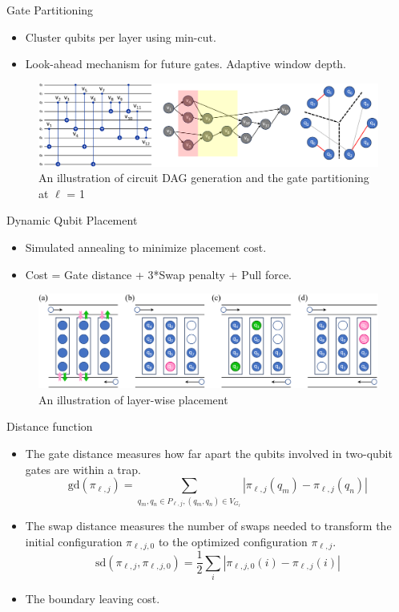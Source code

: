 \documentclass{beamer}
\begin{document}
	\begin{frame}{Gate Partitioning}
		\begin{itemize}
			\item Cluster qubits per layer using min-cut.
			\item Look-ahead mechanism for future gates. Adaptive window depth.
		\end{itemize}
		\begin{figure}
			\includegraphics[width=\textwidth]{figure/cut.png}
			\caption[]{An illustration of circuit DAG generation and the gate partitioning at $\ell$ = 1}
		\end{figure}
	\end{frame}
	
	\begin{frame}{Dynamic Qubit Placement}
		\begin{itemize}
			\item Simulated annealing to minimize placement cost.
			\item Cost = Gate distance + 3*Swap penalty + Pull force.
		\end{itemize}
		\begin{figure}
			\includegraphics[width=.8\textwidth]{figure/qubit.png}
			\caption[]{An illustration of layer-wise placement}
		\end{figure}
	\end{frame}
	
	\begin{frame}{Distance function}
		\begin{itemize}
			\item The gate distance measures how far apart the qubits involved in two-qubit gates are within a trap.
			\[
			\text{gd}(\pi_{\ell,j}) = \sum_{q_m, q_n \in P_{\ell,j},(q_m, q_n) \in V_{G_{\ell}}} |\pi_{\ell,j}(q_m) - \pi_{\ell,j}(q_n)|
			\]
			\item The swap distance measures the number of swaps needed to transform the initial configuration $\pi_{\ell,j,0}$ to the optimized configuration $\pi_{\ell,j}$.
			\[
			\text{sd}(\pi_{\ell,j}, \pi_{\ell,j,0}) = \frac{1}{2} \sum_{i} |\pi_{\ell,j,0}(i) - \pi_{\ell,j}(i)|
			\]
			\item The boundary leaving cost.
		\end{itemize}
	\end{frame}
\end{document}

